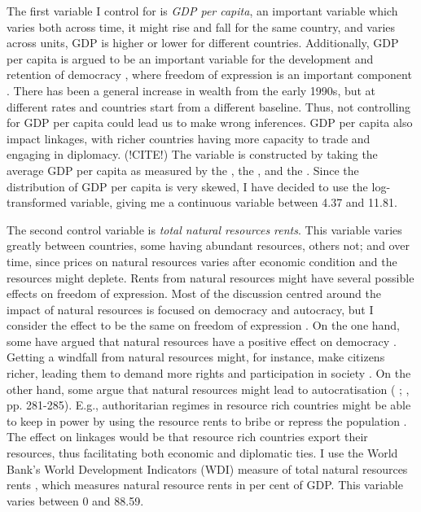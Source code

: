 The first variable I control for is \textit{GDP per capita}, an important variable which varies both across time, it might rise and fall for the same country, and varies across units, GDP is higher or lower for different countries. Additionally, GDP per capita is argued to be an important variable for the development and retention of democracy \citep{lipset_social_1959, przeworski_modernization_1997}, where freedom of expression is an important component \citep[p. 71]{lipset_social_1959}. There has been a general increase in wealth from the early 1990s, but at different rates and countries start from a different baseline. Thus, not controlling for GDP per capita could lead us to make wrong inferences. GDP per capita also impact linkages, with richer countries having more capacity to trade and engaging in diplomacy. (!CITE!) The variable is constructed by taking the average GDP per capita as measured by the \citet{world_bank_world_2025}, the \citet{imf_world_2025}, and the \citet{united_nations_statistics_division_national_2025}. Since the distribution of GDP per capita is very skewed, I have decided to use the log-transformed variable, giving me a continuous variable between 4.37 and 11.81. 

The second control variable is \textit{total natural resources rents}. This variable varies greatly between countries, some having abundant resources, others not; and over time, since prices on natural resources varies after economic condition and the resources might deplete. Rents from natural resources might have several possible effects on freedom of expression. Most of the discussion centred around the impact of natural resources is focused on democracy and autocracy, but I consider the effect to be the same on freedom of expression \citep{lipset_social_1959}. On the one hand, some have argued that natural resources have a positive effect on democracy \citep{brooks_oil_2016, haber_natural_2011}. Getting a windfall from natural resources might, for instance, make citizens richer, leading them to demand more rights and participation in society \citep{brooks_oil_2016, lipset_social_1959}. On the other hand, some argue that natural resources might lead to autocratisation (\citeauthor{andersen_big_2014} \citeyear{andersen_big_2014}; \citeauthor{brooks_oil_2016} \citeyear{brooks_oil_2016}, pp. 281-285). E.g., authoritarian regimes in resource rich countries might be able to keep in power by using the resource rents to bribe or repress the population \citep[p. 282]{brooks_oil_2016}. The effect on linkages would be that resource rich countries export their resources, thus facilitating both economic and diplomatic ties. I use the World Bank's World Development Indicators (WDI) measure of total natural resources rents \citet{world_bank_world_2025}, which measures natural resource rents in per cent of GDP. This variable varies between 0 and 88.59. 

